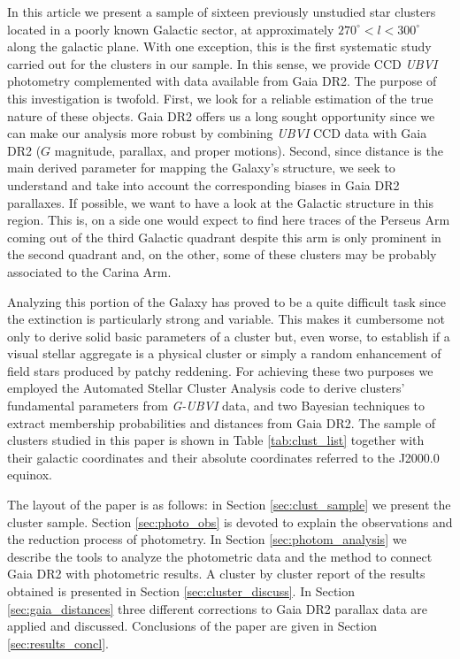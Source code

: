 \documentclass[draft]{aa}
\begin{document}
In this article we present a sample of sixteen previously unstudied star
clusters located in a poorly known Galactic sector, at approximately
$270^\circ<l<300^\circ$ along the galactic plane. With one exception, this is
the first systematic study carried out for the clusters in our sample. In this
sense, we provide CCD \textit{UBVI} photometry complemented with data available
from Gaia DR2. The purpose of this investigation is twofold. First, we look
for a reliable estimation of the true nature of these objects. Gaia DR2 offers
us a long sought opportunity since we can make our analysis more robust by
combining  \textit{UBVI} CCD data with Gaia DR2 ($G$ magnitude, parallax, and
proper motions). Second, since distance is the main derived parameter for
mapping the Galaxy’s structure, we seek to understand and take into account the
corresponding biases in Gaia DR2 parallaxes.
If possible, we want to have a look at the Galactic structure in
this region. This is, on a side one would expect to find here traces of the
Perseus Arm coming out of the third Galactic quadrant despite this arm is only
prominent in the second quadrant and, on the other, some of these clusters may
be probably associated to the Carina Arm.

Analyzing this portion of the Galaxy has proved to be a quite difficult
task since the extinction is particularly strong and variable. This
makes it cumbersome not only to derive solid basic parameters of a cluster
but, even worse, to establish if a visual stellar aggregate is a physical
cluster or simply a random enhancement of field stars produced by patchy
reddening. 
%
For achieving these two purposes we employed the Automated Stellar
Cluster Analysis code \citep[\texttt{ASteCA};][]{Perren_2015} to derive
clusters' fundamental parameters from \textit{G-UBVI} data, and two Bayesian
techniques to extract membership probabilities and distances from Gaia DR2. The
sample of clusters studied in this paper is shown in Table 
\ref{tab:clust_list} together with their galactic coordinates and their
absolute coordinates referred to the J2000.0 equinox.

The layout of the paper is as follows: in Section \ref{sec:clust_sample} we
present the cluster sample.
Section \ref{sec:photo_obs} is devoted to explain the observations and the
reduction process of photometry. In Section \ref{sec:photom_analysis} we
describe the tools to analyze the photometric data and the method to connect
Gaia DR2 with photometric results. A cluster by cluster report of the results
obtained is presented in Section \ref{sec:cluster_discuss}. In Section
\ref{sec:gaia_distances} three different corrections to Gaia DR2 parallax
data are applied and discussed. Conclusions of the paper are given in Section 
\ref{sec:results_concl}.
\end{document}
